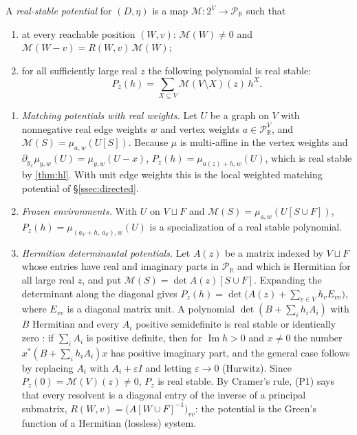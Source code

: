 \documentclass[final]{siamart0516}
\numberwithin{theorem}{section}
\numberwithin{equation}{section}
\theoremstyle{siamnonum}
\theoremstyle{plain}
\newcommand{\RR}{\mathbb{R}}
\newcommand{\Puis}{\mathcal{P}_{\RR}}
\newcommand{\Mpot}{\mathcal{M}}           %
\renewcommand{\Im}{\operatorname{Im}}
\begin{document}
\begin{definition}\label{def:real-stable}
A \emph{real-stable potential} for $(D,\eta)$ is a map $\Mpot\colon2^V\to\Puis$ such that
\begin{enumerate}[label=\textup{(P\arabic*)}]
\item at every reachable position $(W,v)$: $\Mpot(W)\neq0$ and $\Mpot(W-v)=R(W,v)\,\Mpot(W)$;
\item for all sufficiently large real $z$ the following polynomial is real stable:
\[
P_z(h)=\sum_{X\subseteq V}\Mpot(V\setminus X)(z)\,h^X.
\]
\end{enumerate}
\end{definition}

\begin{example}\label{ex:real-stable}
\begin{enumerate}[label=(\alph*)]
\item \emph{Matching potentials with real weights.} Let $U$ be a graph on $V$ with nonnegative real edge weights $w$ and vertex weights $a\in\Puis^V$, and $\Mpot(S)=\mu_{a,w}(U[S])$. Because $\mu$ is multi-affine in the vertex weights and $\partial_{y_x}\mu_{y,w}(U)=\mu_{y,w}(U-x)$, $P_z(h)=\mu_{a(z)+h,w}(U)$, which is real stable by \cref{thm:hl}. With unit edge weights this is the local weighted matching potential of \S\ref{ssec:directed}.
\item \emph{Frozen environments.} With $U$ on $V\sqcup F$ and $\Mpot(S)=\mu_{a,w}(U[S\cup F])$, $P_z(h)=\mu_{(a_V+h,\,a_F),w}(U)$ is a specialization of a real stable polynomial.
\item \emph{Hermitian determinantal potentials.} Let $A(z)$ be a matrix indexed by $V\sqcup F$ whose entries have real and imaginary parts in $\Puis$ and which is Hermitian for all large real $z$, and put $\Mpot(S)=\det A(z)[S\cup F]$. Expanding the determinant along the diagonal gives $P_z(h)=\det\bigl(A(z)+\sum_{v\in V}h_vE_{vv}\bigr)$, where $E_{vv}$ is a diagonal matrix unit. A polynomial $\det(B+\sum_ih_iA_i)$ with $B$ Hermitian and every $A_i$ positive semidefinite is real stable or identically zero \cite[Prop.~2.4]{BorceaBranden}: if $\sum_iA_i$ is positive definite, then for $\Im h>0$ and $x\neq0$ the number $x^{*}(B+\sum_ih_iA_i)x$ has positive imaginary part, and the general case follows by replacing $A_i$ with $A_i+\varepsilon I$ and letting $\varepsilon\to0$ (Hurwitz). Since $P_z(0)=\Mpot(V)(z)\neq0$, $P_z$ is real stable. By Cramer's rule, \textup{(P1)} says that every resolvent is a diagonal entry of the inverse of a principal submatrix, $R(W,v)=\bigl(A[W\cup F]^{-1}\bigr)_{vv}$: the potential is the Green's function of a Hermitian (lossless) system.
\end{enumerate}
\end{example}
\end{document}
